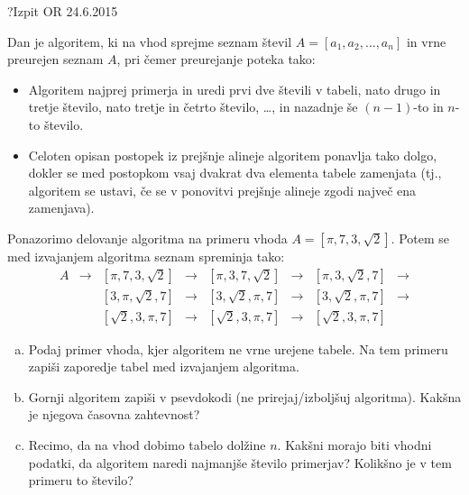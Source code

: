 \begin{naloga}{?}{Izpit OR 24.6.2015}
\begin{vprasanje}
Dan je algoritem, ki na vhod sprejme seznam števil
$A = [a_1, a_2, \dots, a_n]$
in vrne preurejen seznam $A$,
pri čemer preurejanje poteka tako:
\begin{itemize}
\item Algoritem najprej primerja in uredi prvi dve števili v tabeli,
nato drugo in tretje število, nato tretje in četrto število, \dots,
in nazadnje še $(n-1)$-to in $n$-to število.
\item Celoten opisan postopek iz prejšnje alineje
algoritem ponavlja tako dolgo,
dokler se med postopkom vsaj dvakrat dva elementa tabele zamenjata
(tj., algoritem se ustavi,
če se v ponovitvi prejšnje alineje zgodi največ ena zamenjava).
\end{itemize}

Ponazorimo delovanje algoritma na primeru vhoda $A = [\pi, 7, 3, \sqrt{2}]$.
Potem se med izvajanjem algoritma seznam spreminja tako:
$$
\begin{array}{cccccccc}
A &\to& [\pi, 7, 3, \sqrt{2}]
  &\to& [\pi, 3, 7, \sqrt{2}]
  &\to& [\pi, 3, \sqrt{2}, 7] &\to \\
  &   & [3, \pi, \sqrt{2}, 7]
  &\to& [3, \sqrt{2}, \pi, 7]
  &\to& [3, \sqrt{2}, \pi, 7] &\to \\
  &   & [\sqrt{2}, 3, \pi, 7]
  &\to& [\sqrt{2}, 3, \pi, 7]
  &\to& [\sqrt{2}, 3, \pi, 7]
\end{array}
$$

\begin{enumerate}[(a)]
\item Podaj primer vhoda, kjer algoritem ne vrne urejene tabele.
Na tem primeru zapiši zaporedje tabel med izvajanjem algoritma.

\item Gornji algoritem zapiši v psevdokodi (ne prirejaj/izboljšuj algoritma).
Kakšna je njegova časovna zahtevnost?

\item Recimo, da na vhod dobimo tabelo dolžine $n$.
Kakšni morajo biti vhodni podatki,
da algoritem naredi najmanjše število primerjav?
Kolikšno je v tem primeru to število?
\end{enumerate}
\end{vprasanje}
\begin{odgovor}
\end{odgovor}
\end{naloga}
